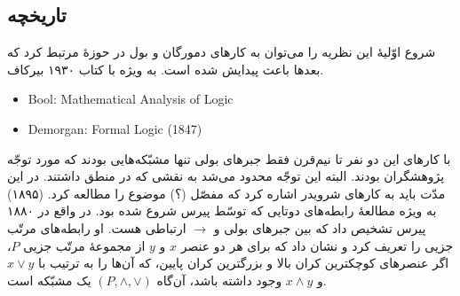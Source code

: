 \subsection{تاریخچه}
شروع اوّلیهٔ این نظریه را می‌توان به کارهای دمورگان و بول در حوزهٔ  مرتبط کرد که بعدها باعث پیدایش  شده است. به ویژه با کتاب ۱۹۳۰ بیرکاف.
\begin{LTR}
  \begin{itemize}
    \item Bool: Mathematical Analysis of Logic
    \item Demorgan: Formal Logic (1847)
  \end{itemize}
\end{LTR}
با کارهای این دو نفر تا نیم‌قرن فقط جبرهای بولی تنها مشبّکه‌هایی بودند که مورد توجّه پژوهشگران بودند. البته این توجّه محدود می‌شد به نقشی که در منطق داشتند. در این مدّت باید به کارهای شرویدر اشاره کرد که مفصّل {\red (؟)} موضوع  را مطالعه کرد. (۱۸۹۵) به ویژه مطالعهٔ رابطه‌های دوتایی که توسّط پیرس شروع شده بود. در واقع در ۱۸۸۰ پیرس تشخیص داد که بین جبرهای بولی و $\to$ ارتباطی هست. او رابطه‌های مرتّب جزیی را تعریف کرد و نشان داد که برای هر دو عنصر $x$ و $y$ از مجموعهٔ مرتّب جزیی $P$، اگر عنصر‌های کوچکترین کران بالا و بزرگترین کران پایین، که آن‌ها را به ترتیب با $x \vee y$ و $x \wedge y$ وجود داشته باشد، آن‌گاه $(P, \wedge, \vee)$ یک مشبّکه است.
